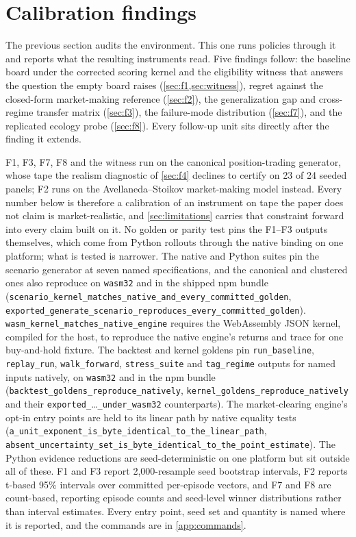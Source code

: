 \section{Calibration findings}\label{sec:findings}

The previous section audits the environment. This one runs policies through it and reports what the resulting instruments read. Five findings follow: the baseline board under the corrected scoring kernel and the eligibility witness that answers the question the empty board raises (\cref{sec:f1,sec:witness}), regret against the closed-form market-making reference (\cref{sec:f2}), the generalization gap and cross-regime transfer matrix (\cref{sec:f3}), the failure-mode distribution (\cref{sec:f7}), and the replicated ecology probe (\cref{sec:f8}). Every follow-up unit sits directly after the finding it extends.

F1, F3, F7, F8 and the witness run on the canonical position-trading generator, whose tape the realism diagnostic of \cref{sec:f4} declines to certify on 23 of 24 seeded panels; F2 runs on the Avellaneda--Stoikov market-making model instead. Every number below is therefore a calibration of an instrument on tape the paper does not claim is market-realistic, and \cref{sec:limitations} carries that constraint forward into every claim built on it. No golden or parity test pins the F1--F3 outputs themselves, which come from Python rollouts through the native binding on one platform; what is tested is narrower. The native and Python suites pin the scenario generator at seven named specifications, and the canonical and clustered ones also reproduce on \texttt{wasm32} and in the shipped npm bundle (\texttt{scenario\_kernel\_matches\_native\_and\_every\_committed\_golden}, \texttt{exported\_generate\_scenario\_reproduces\_every\_committed\_golden}). \texttt{wasm\_kernel\_matches\_native\_engine} requires the WebAssembly JSON kernel, compiled for the host, to reproduce the native engine's returns and trace for one buy-and-hold fixture. The backtest and kernel goldens pin \texttt{run\_baseline}, \texttt{replay\_run}, \texttt{walk\_forward}, \texttt{stress\_suite} and \texttt{tag\_regime} outputs for named inputs natively, on \texttt{wasm32} and in the npm bundle (\texttt{backtest\_goldens\_reproduce\_natively}, \texttt{kernel\_goldens\_reproduce\_natively} and their \texttt{exported\_}\ldots\texttt{\_under\_wasm32} counterparts). The market-clearing engine's opt-in entry points are held to its linear path by native equality tests (\texttt{a\_unit\_exponent\_is\_byte\_identical\_to\_the\_linear\_path}, \texttt{absent\_uncertainty\_set\_is\_byte\_identical\_to\_the\_point\_estimate}). The Python evidence reductions are seed-deterministic on one platform but sit outside all of these. F1 and F3 report 2{,}000-resample seed bootstrap intervals, F2 reports t-based 95\% intervals over committed per-episode vectors, and F7 and F8 are count-based, reporting episode counts and seed-level winner distributions rather than interval estimates. Every entry point, seed set and quantity is named where it is reported, and the commands are in \cref{app:commands}.

